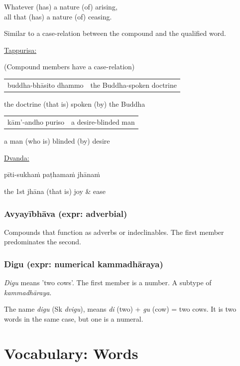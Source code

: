 \documentclass[11pt,oneside]{memoir}
\begin{document}
Whatever (has) a nature (of) arising,\\
all that (has) a nature (of) ceasing.

Similar to a case-relation between the compound and the qualified word.

\uline{Tappurisa:}

(Compound members have a case-relation)

\begin{center}
\begin{tabular}{ll}
buddha-bhāsito dhammo & the Buddha-spoken doctrine\\
\end{tabular}
\end{center}

the doctrine (that is) spoken (by) the Buddha

\begin{center}
\begin{tabular}{ll}
kām'-andho puriso & a desire-blinded man\\
\end{tabular}
\end{center}

a man (who is) blinded (by) desire

\uline{Dvanda:}

pīti-sukhaṁ paṭhamaṁ jhānaṁ

the 1st jhāna (that is) joy \& ease
\subsection{Avyayībhāva (expr: adverbial)}
\label{sec:org37b8a2a}

Compounds that function as adverbs or indeclinables. The first member predominates the second.
\subsection{Digu (expr: numerical kammadhāraya)}
\label{sec:orgf3baf1c}

\emph{Digu} means 'two cows'. The first member is a number. A subtype of \emph{kammadhāraya}.

The name \emph{digu} (Sk \emph{dvigu}), means \emph{di} (two) + \emph{gu} (cow) = two cows. It is two words in the same case, but one is a numeral.

\clearpage
\chapter{Vocabulary: Words}
\label{sec:org54d823f}
\end{document}
